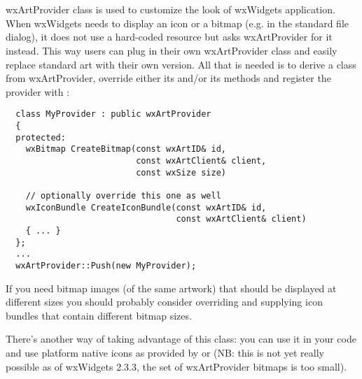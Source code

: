 %
%

\section{}\label{wxartprovider}

wxArtProvider class is used to customize the look of wxWidgets application.
When wxWidgets needs to display an icon or a bitmap (e.g. in the standard file
dialog), it does not use a hard-coded resource but asks wxArtProvider for it
instead. This way users can plug in their own wxArtProvider class and easily
replace standard art with their own version. All
that is needed is to derive a class from wxArtProvider, override either its
 and/or its
 methods
and register the provider with
:

\begin{verbatim}
  class MyProvider : public wxArtProvider
  {
  protected:
    wxBitmap CreateBitmap(const wxArtID& id, 
                          const wxArtClient& client,
                          const wxSize size)

    // optionally override this one as well
    wxIconBundle CreateIconBundle(const wxArtID& id,
                                  const wxArtClient& client)
    { ... }
  };
  ...
  wxArtProvider::Push(new MyProvider);
\end{verbatim}

If you need bitmap images (of the same artwork) that should be displayed at different sizes
you should probably consider overriding  
and supplying icon bundles that contain different bitmap sizes.

There's another way of taking advantage of this class: you can use it in your code and use
platform native icons as provided by  or 
 (NB: this is not yet really
possible as of wxWidgets 2.3.3, the set of wxArtProvider bitmaps is too
small). 


\label{artprovideridentifying}

